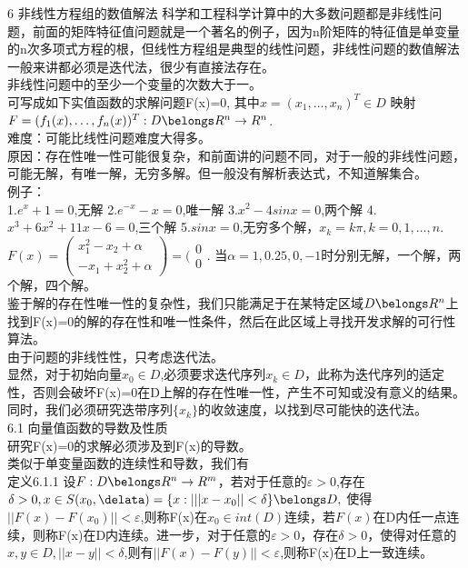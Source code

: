 \documentclass[a4paper,12pt]{article}
\begin{document}
\begin{CJK*}{UTF8}{gbsn}
	6 非线性方程组的数值解法
	科学和工程科学计算中的大多数问题都是非线性问题，前面的矩阵特征值问题就是一个著名的例子，因为n阶矩阵的特征值是单变量的n次多项式方程的根，但线性方程组是典型的线性问题，非线性问题的数值解法一般来讲都必须是迭代法，很少有直接法存在。\\
	非线性问题中的至少一个变量的次数大于一。\\
	可写成如下实值函数的求解问题F(x)=0,
	其中$x=(x_1,\ldots,x_n)^T\in D$
	映射$F=(f_1(x),\ldots,f_n(x))^T:D\belongs R^n \rightarrow R^n$.\\
	难度：可能比线性问题难度大得多。\\
	原因：存在性唯一性可能很复杂，和前面讲的问题不同，对于一般的非线性问题，可能无解，有唯一解，无穷多解。但一般没有解析表达式，不知道解集合。\\
	例子：\\
	1.$e^x + 1 =0$,无解
	2.$e^{-x} -x = 0$,唯一解
	3.$x^2-4sinx=0$,两个解
	4.$x^3+6x^2+11x-6=0$,三个解
	5.$sinx=0$,无穷多个解，$x_k=k\pi,k=0,1,\ldots,n.$
	$F(x) = (
	\begin{array}{c}x_1^2-x_2+\alpha\\-x_1+x_2^2+\alpha\end{array})=(\begin{array}{c}0\\0
	\end{array}$.
	当$\alpha=1,0.25,0,-1$时分别无解，一个解，两个解，四个解。\\
	鉴于解的存在性唯一性的复杂性，我们只能满足于在某特定区域$D\belongs R^n$上找到F(x)=0的解的存在性和唯一性条件，然后在此区域上寻找开发求解的可行性算法。\\
	由于问题的非线性性，只考虑迭代法。\\
	显然，对于初始向量$x_0\in D$,必须要求迭代序列${x_k}\in D$，此称为迭代序列的适定性，否则会破坏F(x)=0在D上解的存在性唯一性，产生不可知或没有意义的结果。\\
	同时，我们必须研究迭带序列$\{x_k\}$的收敛速度，以找到尽可能快的迭代法。\\
	6.1 向量值函数的导数及性质\\
	研究F(x)=0的求解必须涉及到F(x)的导数。\\
	类似于单变量函数的连续性和导数，我们有\\
	定义6.1.1 设$F:D\belongs R^n \rightarrow R^m$，若对于任意的$\varepsilon > 0$,存在
	$\delta >0,x\in S(x_0,\delata)=\{x:| ||x-x_0|| < \delta\}\belongs D,$
	使得$||F(x)-F(x_0)||<\varepsilon$,则称F(x)在$x_0\in int(D)$连续，若$F(x)$在D内任一点连续，则称F(x)在D内连续。进一步，对于任意的$\varepsilon>0$，存在$\delta>0$，使得对任意的$x,y\in D,||x-y||<\delta$,则有$||F(x)-F(y)||<\varepsilon$,则称F(x)在D上一致连续。\\

\end{CJK*}
\end{document}
